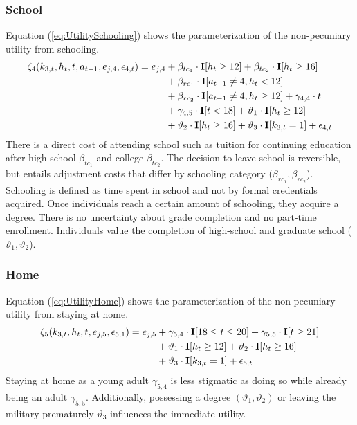 \subsubsection*{School}
Equation (\ref{eq:UtilitySchooling}) shows the parameterization of the non-pecuniary utility from schooling.
%
\begin{align}\label{eq:UtilitySchooling}
	\zeta_4(k_{3,t}, h_t, t, a_{t-1}, e_{j,4}, \epsilon_{4,t})  = e_{j,4} & + \beta_{tc_1} \cdot {\textbf{I}}[h_t \geq 12] + \beta_{tc_2} \cdot {\textbf{I}}[h_t \geq 16]   \\\nonumber
    							  & + \beta_{rc_1} \cdot {\textbf{I}}[a_{t-1} \neq 4, h_t < 12]  \\\nonumber
    							  & + \beta_{rc_2} \cdot {\textbf{I}}[a_{t-1} \neq 4, h_t \geq 12]+ \gamma_{4,4} \cdot t  \\\nonumber
     							  & + \gamma_{4,5} \cdot {\textbf{I}}[t < 18] + \vartheta_1 \cdot {\textbf{I}}[h_t \geq 12]  \\\nonumber
      							& + \vartheta_2 \cdot {\textbf{I}}[h_t \geq 16]+ \vartheta_3 \cdot {\textbf{I}}[k_{3,t} = 1] + \epsilon_{4,t}
\end{align}
%
There is a direct cost of attending school such as tuition for continuing education after high school $\beta_{tc_1}$ and college $\beta_{tc_2}$. The decision to leave school is reversible, but entails adjustment costs that differ by schooling category ($\beta_{rc_1}, \beta_{rc_2}$). Schooling is defined as time spent in school and not by formal credentials acquired. Once individuals reach a certain amount of schooling, they acquire a degree. There is no uncertainty about grade completion \citep{Altonji.1993} and no part-time enrollment. Individuals value the completion of high-school and graduate school ($\vartheta_1, \vartheta_2$).
\subsubsection*{Home}
Equation (\ref{eq:UtilityHome}) shows the parameterization of the non-pecuniary utility from staying at home.
%
\begin{align}\label{eq:UtilityHome}
	\zeta_5(k_{3,t}, h_t, t, e_{j,5}, \epsilon_{5,1}) =  e_{j,5} & + \gamma_{5,4} \cdot {\textbf{I}}[18 \leq t \leq 20] + \gamma_{5,5} \cdot {\textbf{I}}[t \geq 21] \\ \nonumber
    							   & +\vartheta_{1} \cdot {\textbf{I}}[h_t \geq 12] + \vartheta_{2} \cdot {\textbf{I}}[h_t \geq 16] \\ \nonumber
    							   & +  \vartheta_3 \cdot {\textbf{I}}[k_{3,t} = 1]+ \epsilon_{5,t}
\end{align}
%
Staying at home as a young adult $\gamma_{5, 4}$ is less stigmatic as doing so while already being an adult $\gamma_{5,5}$. Additionally, possessing a degree  $(\vartheta_1, \vartheta_2)$ or leaving the military prematurely $\vartheta_3$ influences the immediate utility.
